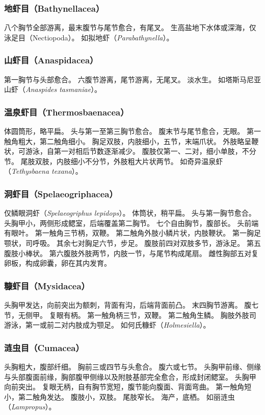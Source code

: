 \documentclass[11pt]{article}
\begin{document}
\subsubsection{地虾目（Bathynellacea）}
八个胸节全部游离，最末腹节与尾节愈合，有尾叉。
生高盐地下水体或深海，仅泳足目（Nectiopoda）。
如拟地虾（\textit{Parabathynella}）。

\subsubsection{山虾目（Anaspidacea）}
第一胸节与头部愈合。
六腹节游离，尾节游离，无尾叉。
淡水生。
如塔斯马尼亚山虾（\textit{Anaspides tasmaniae}）。

\subsubsection{温泉虾目（Thermosbaenacea）}
体圆筒形，略平扁。
头与第一至第三胸节愈合。
腹末节与尾节愈合，无眼。
第一触角粗大，第二触角细小。
胸足双肢，内肢细小，五节，末端爪状。
外肢略呈鞭状，可游泳，自第一对相后节数逐渐减少。
腹肢仅第一、二对，细小单肢，不分节。
尾肢双肢，内肢细小不分节，外肢粗大片状两节。
如奇异温泉虾（\textit{Tethysbaena texana}）。

\subsubsection{洞虾目（Spelaeogriphacea）}
仅鳞眼洞虾（\textit{Spelaeogriphus lepidops}）。
体筒状，稍平扁。
头与第一胸节愈合。
头胸甲小，两侧形成鳃室，后端覆盖第二胸节。
七个自由胸节，腹部长。
头前端有眼叶。
第一触角三节柄，双鞭。
第二触角外肢小鳞片状，内肢鞭状。
第一胸足颚状，司呼吸。
其余七对胸足六节，步足。
腹肢前四对双肢多节，游泳足。
第五腹肢小棒状。
第六腹肢外肢两节，内肢一节，与尾节构成尾扇。
雌性胸部五对复卵板，构成卵囊，卵在其内发育。

\subsubsection{糠虾目（Mysidacea）}
头胸甲发达，向前突出为额刺，背面有沟，后端背面前凸。
末四胸节游离。
腹七节，无侧甲。
复眼有柄。
第一触角柄三节，双鞭。
第二触角生鳞。
胸肢外肢司游泳，第一或前二对内肢成为颚足。
如何氏糠虾（\textit{Holmesiella}）。

\subsubsection{涟虫目（Cumacea）}
头胸粗大，腹部纤细。
胸前三或四节与头愈合。
腹六或七节。
头胸甲前缘、侧缘与头部腹面前缘，胸部腹甲侧缘以及附肢基部完全愈合，形成封闭鳃室。
头胸甲向前突出。
复眼无柄，自有胸节宽短，腹节能向腹面、背面弯曲。
第一触角短小，第二触角发达。
腹肢小，双肢。
尾肢窄长。
海产，底栖。
如丽涟虫（\textit{Lampropus}）。
\end{document}
